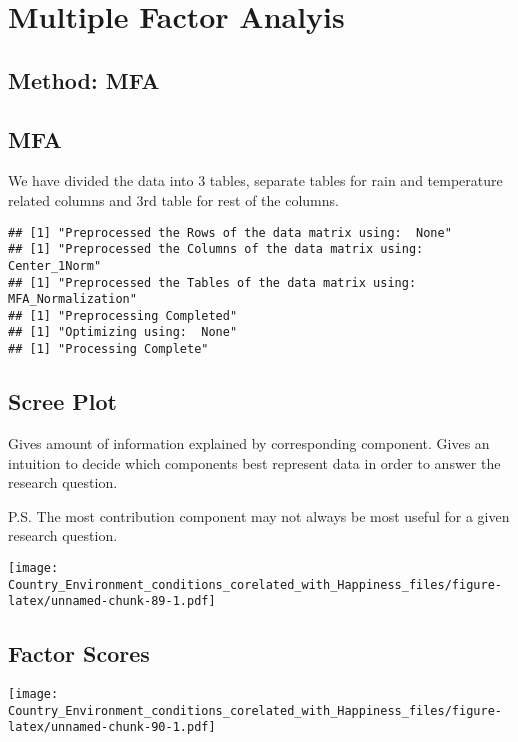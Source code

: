 \documentclass[]{book}
\begin{document}
\hypertarget{multiple-factor-analyis}{%
\chapter{Multiple Factor Analyis}\label{multiple-factor-analyis}}

\hypertarget{method-mfa}{%
\section{Method: MFA}\label{method-mfa}}

\hypertarget{mfa}{%
\section{MFA}\label{mfa}}

We have divided the data into 3 tables, separate tables for rain and
temperature related columns and 3rd table for rest of the columns.

\begin{verbatim}
## [1] "Preprocessed the Rows of the data matrix using:  None"
## [1] "Preprocessed the Columns of the data matrix using:  Center_1Norm"
## [1] "Preprocessed the Tables of the data matrix using:  MFA_Normalization"
## [1] "Preprocessing Completed"
## [1] "Optimizing using:  None"
## [1] "Processing Complete"
\end{verbatim}

\hypertarget{scree-plot-5}{%
\section{Scree Plot}\label{scree-plot-5}}

Gives amount of information explained by corresponding component. Gives
an intuition to decide which components best represent data in order to
answer the research question.

P.S. The most contribution component may not always be most useful for a
given research question.

\texttt{[image: Country\_Environment\_conditions\_corelated\_with\_Happiness\_files/figure-latex/unnamed-chunk-89-1.pdf]}

\hypertarget{factor-scores-4}{%
\section{Factor Scores}\label{factor-scores-4}}

\texttt{[image: Country\_Environment\_conditions\_corelated\_with\_Happiness\_files/figure-latex/unnamed-chunk-90-1.pdf]}
\end{document}
